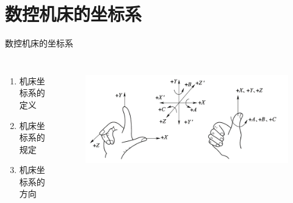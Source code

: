 \documentclass[UTF8,zihao=-4]{ctexbeamer}
\begin{document}
\section{数控机床的坐标系}
\begin{frame}{数控机床的坐标系}
\begin{columns}
	\begin{enumerate}
		\item 机床坐标系的定义
		\item 机床坐标系的规定 
		\item 机床坐标系的方向
	\end{enumerate} 
	\begin{figure}
		\centering
		\includegraphics[width= \linewidth]{image/1-22}
		\label{fig:1-22}
	\end{figure}
\end{columns}
\end{frame}
\end{document}
